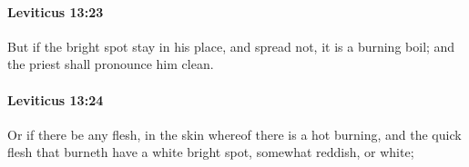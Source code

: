 		\paragraph{Leviticus 13:23} %
			\label{LEVITICUS-13-23}

			But if the bright spot stay in his place, and spread not, it is a burning boil; and the priest shall pronounce him clean.


		\paragraph{Leviticus 13:24} %
			\label{LEVITICUS-13-24}

			Or if there be any flesh, in the skin whereof there is a hot burning, and the quick flesh that burneth have a white bright spot, somewhat reddish, or white;


